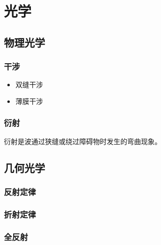 \section{光学}
\subsection{物理光学}
\subsubsection{干涉}
\begin{itemize}
  \item 双缝干涉
  \item 薄膜干涉
\end{itemize}
\subsubsection{衍射}
衍射是波通过狭缝或绕过障碍物时发生的弯曲现象。
\subsection{几何光学}
\subsubsection{反射定律}
\subsubsection{折射定律}
\subsubsection{全反射}
